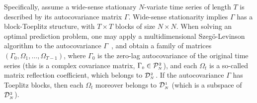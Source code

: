 \documentclass[draftclsnofoot]{IEEEtran}
\begin{document}
Specifically, assume a wide-sense stationary $N$-variate time series of length $T$ is described by its autocovariance matrix $\Gamma$. Wide-sense stationarity implies $\Gamma$ has a block-Toeplitz structure, with $T \times T$ blocks of size $N \times N$. When solving an optimal prediction problem, one may apply a multidimensional Szegö-Levinson algorithm to the autocovariance $\Gamma$~\cite{jeuris1}\cite{yannthesis}, and obtain a family of matrices $(\Gamma_{\scriptscriptstyle 0},\Omega_{\scriptscriptstyle 1},\ldots, \Omega_{\scriptscriptstyle T-1})$, where $\Gamma_{\scriptscriptstyle 0}$ is the zero-lag autocovariance of the original time series (this is a complex covariance matrix, $\Gamma_{\scriptscriptstyle 0} \in \mathcal{P}^{\hspace{0.02cm}\scriptscriptstyle 2}_{\scriptscriptstyle N\hspace{0.03cm}}$), and each $\Omega_t$ is a so-called matrix reflection coefficient, which belongs to $\mathcal{D}^{\hspace{0.02cm}\scriptscriptstyle 2}_{\scriptscriptstyle N\hspace{0.03cm}}$. If the autocovariance $\Gamma$ has Toeplitz blocks, then each $\Omega_t$ moreover belongs to $\mathcal{D}^{\hspace{0.02cm}\scriptscriptstyle 1}_{\scriptscriptstyle N}$ (which is a subspace of  $\mathcal{D}^{\hspace{0.02cm}\scriptscriptstyle 2}_{\scriptscriptstyle N}$).   
\end{document}
